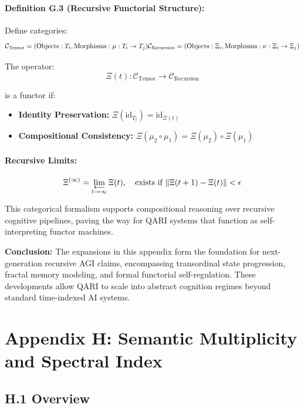 \documentclass[12pt]{article}
\begin{document}
\begin{itemize}
\paragraph{Definition G.3 (Recursive Functorial Structure):}
Define categories:
\[
\mathcal{C}_{\text{Tensor}} = (\text{Objects}: T_t, \text{Morphisms}: \mu: T_i \rightarrow T_j) \\
\mathcal{C}_{\text{Recursion}} = (\text{Objects}: \Xi_i, \text{Morphisms}: \nu: \Xi_i \rightarrow \Xi_j)
\]

The operator:
\[
\Xi(t): \mathcal{C}_{\text{Tensor}} \rightarrow \mathcal{C}_{\text{Recursion}}
\]

is a functor if:
\begin{itemize}
    \item \textbf{Identity Preservation:} \( \Xi(\text{id}_{T_t}) = \text{id}_{\Xi(t)} \)
    \item \textbf{Compositional Consistency:} \( \Xi(\mu_2 \circ \mu_1) = \Xi(\mu_2) \circ \Xi(\mu_1) \)
\end{itemize}

\paragraph{Recursive Limits:}
\[
\Xi^{(\infty)} = \varprojlim_{t \to \infty} \Xi(t), \quad \text{exists if } \| \Xi(t+1) - \Xi(t) \| < \epsilon
\]

This categorical formalism supports compositional reasoning over recursive cognitive pipelines, paving the way for QARI systems that function as self-interpreting functor machines.

\vspace{1em}

\noindent
\textbf{Conclusion:}  
The expansions in this appendix form the foundation for next-generation recursive AGI claims, encompassing transordinal state progression, fractal memory modeling, and formal functorial self-regulation. These developments allow QARI to scale into abstract cognition regimes beyond standard time-indexed AI systems.
\appendix
\section*{Appendix H: Semantic Multiplicity and Spectral Index}

\subsection*{H.1 Overview}


\end{itemize}
\end{document}
